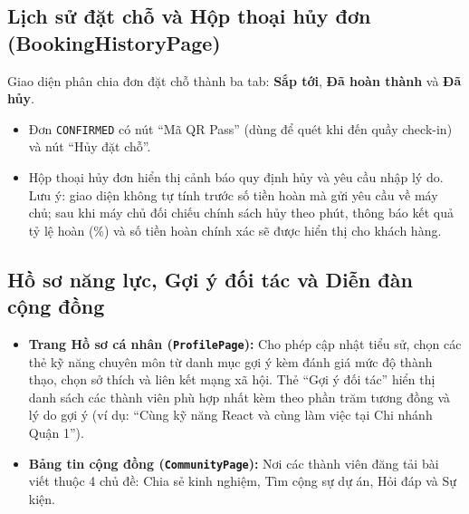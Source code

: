 
\subsection{Lịch sử đặt chỗ và Hộp thoại hủy đơn (BookingHistoryPage)}
Giao diện phân chia đơn đặt chỗ thành ba tab: \textbf{Sắp tới}, \textbf{Đã hoàn thành} và \textbf{Đã hủy}.
\begin{itemize}
    \item Đơn \texttt{CONFIRMED} có nút ``Mã QR Pass'' (dùng để quét khi đến quầy check-in) và nút ``Hủy đặt chỗ''.
    \item Hộp thoại hủy đơn hiển thị cảnh báo quy định hủy và yêu cầu nhập lý do. Lưu ý: giao diện không tự tính trước số tiền hoàn mà gửi yêu cầu về máy chủ; sau khi máy chủ đối chiếu chính sách hủy theo phút, thông báo kết quả tỷ lệ hoàn (\%) và số tiền hoàn chính xác sẽ được hiển thị cho khách hàng.
\end{itemize}


\subsection{Hồ sơ năng lực, Gợi ý đối tác và Diễn đàn cộng đồng}
\begin{itemize}
    \item \textbf{Trang Hồ sơ cá nhân (\texttt{ProfilePage}):} Cho phép cập nhật tiểu sử, chọn các thẻ kỹ năng chuyên môn từ danh mục gợi ý kèm đánh giá mức độ thành thạo, chọn sở thích và liên kết mạng xã hội. Thẻ ``Gợi ý đối tác'' hiển thị danh sách các thành viên phù hợp nhất kèm theo phần trăm tương đồng và lý do gợi ý (ví dụ: ``Cùng kỹ năng React và cùng làm việc tại Chi nhánh Quận 1'').
    \item \textbf{Bảng tin cộng đồng (\texttt{CommunityPage}):} Nơi các thành viên đăng tải bài viết thuộc 4 chủ đề: Chia sẻ kinh nghiệm, Tìm cộng sự dự án, Hỏi đáp và Sự kiện.
\end{itemize}


